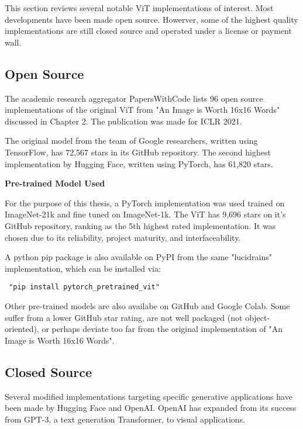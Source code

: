 This section reviews several notable ViT implementations of interest.
Most developments have been made open source. Howerver, some of the 
highest quality implementations are still closed source and operated 
under a license or payment wall.

\subsection{Open Source}

The academic research aggregator PapersWithCode lists 96 open source implementations of 
the original ViT from "An Image is Worth 16x16 Words" discussed in Chapter 2. 
The publication was made for ICLR 2021. \citep{Papers16}

The original model from the team of Google researchers, written using TensorFlow, has 72,567 stars in its GitHub repository.
The second highest implementation by Hugging Face, written using PyTorch, has 61,820 stars. 


\vspace{5mm}

\textbf{Pre-trained Model Used}

For the purpose of this thesis, a PyTorch implementation was used trained on ImageNet-21k
and fine tuned on ImageNet-1k. The ViT has 9,696 stars on it's GitHub repository,
ranking as the 5th highest rated implementation. It was chosen due to its reliability,
project maturity, and interfaceability. \citep{Papers16}

\vspace{5mm}

A python pip package is also available on PyPI from the same "lucidrains" implementation,
which can be installed via: 
\begin{verbatim} "pip install pytorch_pretrained_vit" \end{verbatim}


Other pre-trained models are also availabe on GitHub and Google Colab. 
Some suffer from a lower GitHub star rating, are not well packaged (not object-oriented), or perhaps deviate too far
from the original implementation of "An Image is Worth 16x16 Words". 


\subsection{Closed Source}


Several modified implementations targeting specific generative applications have been made by Hugging Face and OpenAI.
OpenAI has expanded from its success from GPT-3, a text generation Transformer, to visual applications.

